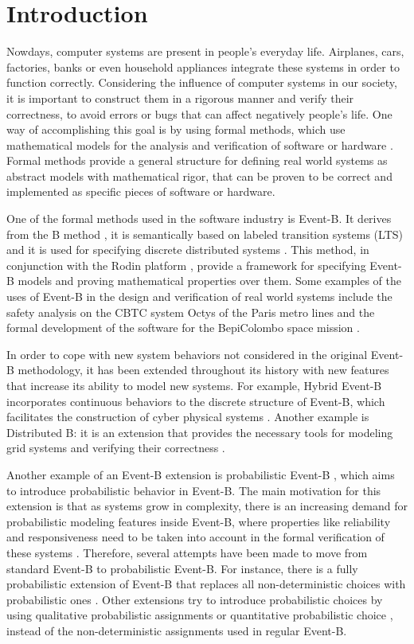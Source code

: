 \chapter{Introduction}
Nowdays, computer systems are present in people's everyday life. Airplanes, cars, factories, banks or even household appliances integrate these systems in order to function correctly. Considering the influence of computer systems in our society, it is important to construct them in a rigorous manner and verify their correctness, to avoid errors or bugs that can affect negatively people's life. One way of accomplishing this goal is by using formal methods, which use mathematical models for the analysis and verification of software or hardware \cite{Woodcock2009}. Formal methods provide a general structure for defining real world systems as abstract models with mathematical rigor, that can be proven to be correct and implemented as specific pieces of software or hardware.   

One of the formal methods used in the software industry is Event-B. It derives from the B method \cite{Abrial1996}, it is semantically based on labeled transition systems (LTS) \cite{LTS} and it is used for specifying discrete distributed systems \cite{Abrial2011}. This method, in conjunction with the Rodin platform \cite{Rodin}, provide a framework for specifying Event-B models and proving mathematical properties over them. Some examples of the uses of Event-B in the design and verification of real world systems include the safety analysis on the CBTC system Octys of the Paris metro lines \cite{Comptier2017} and the formal development of the software for the BepiColombo space mission \cite{Iliasov2010}. 

In order to cope with new system behaviors not considered in the original Event-B methodology, it has been extended throughout its history with new features that increase its ability to model new systems. For example, Hybrid Event-B incorporates continuous behaviors to the discrete structure of Event-B, which facilitates the construction of cyber physical systems \cite{Banach2015}. Another example is Distributed B: it is an extension that provides the necessary tools for modeling grid systems and verifying their correctness \cite{Grid}.

Another example of an Event-B extension is probabilistic Event-B \cite{Morgan2005}, which aims to introduce probabilistic behavior in Event-B. The main motivation for this extension is that as systems grow in complexity, there is an increasing demand for probabilistic modeling features inside Event-B, where properties like reliability and responsiveness need to be taken into account in the formal verification of these systems \cite{Aouadhi2017}. Therefore, several attempts have been made to move from standard Event-B to probabilistic Event-B. For instance, there is a fully probabilistic extension of Event-B that replaces all non-deterministic choices with probabilistic ones \cite{Aouadhi2017}. Other extensions try to introduce probabilistic choices by using qualitative probabilistic assignments \cite{Hallerstede2007} or quantitative probabilistic choice \cite{Tarasyuk2010}, instead of the non-deterministic assignments used in regular Event-B.

